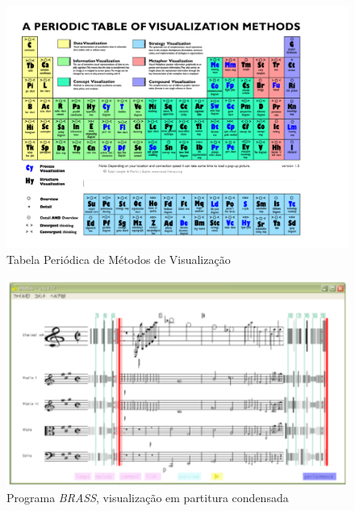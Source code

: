 \documentclass{sciposter}
\begin{document}
\begin{multicols}{2}

\begin{figure}
  \centering
  \includegraphics{./figs/tabela-periodica.pdf}
  \caption{Tabela Periódica de Métodos de Visualização \cite{Lengler2007}}
  \label{fig:label-figura}
\end{figure}

\begin{figure}
  \centering
  \includegraphics{./figs/watanabe-brass.pdf}
  \caption{Programa \textit{BRASS}, visualização em partitura condensada \cite{Watanabe2003}}
  \label{fig:label-figura}
\end{figure}


\end{multicols}
\end{document}
